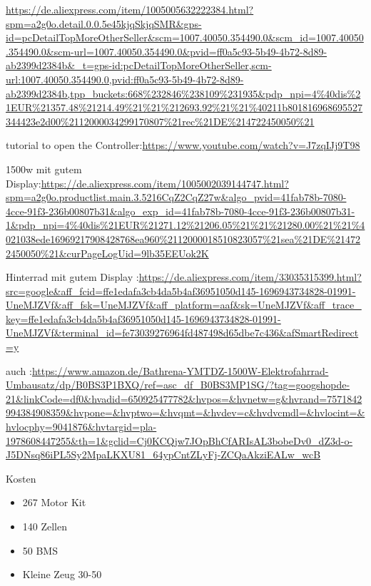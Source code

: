 

\url{https://de.aliexpress.com/item/1005005632222384.html?spm=a2g0o.detail.0.0.5e45kjqSkjqSMR&gps-id=pcDetailTopMoreOtherSeller&scm=1007.40050.354490.0&scm_id=1007.40050.354490.0&scm-url=1007.40050.354490.0&pvid=ff0a5c93-5b49-4b72-8d89-ab2399d2384b&_t=gps-id:pcDetailTopMoreOtherSeller,scm-url:1007.40050.354490.0,pvid:ff0a5c93-5b49-4b72-8d89-ab2399d2384b,tpp_buckets:668%232846%238109%231935&pdp_npi=4%40dis%21EUR%21357.48%21214.49%21%21%212693.92%21%21%40211b801816968695527344423e2d00%2112000034299170807%21rec%21DE%214722450050%21}


tutorial to open the Controller:\url{https://www.youtube.com/watch?v=J7zqIJj9T98}

1500w mit gutem Display:\url{https://de.aliexpress.com/item/1005002039144747.html?spm=a2g0o.productlist.main.3.5216CqZ2CqZ27w&algo_pvid=41fab78b-7080-4cce-91f3-236b00807b31&algo_exp_id=41fab78b-7080-4cce-91f3-236b00807b31-1&pdp_npi=4%40dis%21EUR%21271.12%21206.05%21%21%21280.00%21%21%4021038ede16969217908428768ea960%2112000018510823057%21sea%21DE%214722450050%21&curPageLogUid=9lb35EEUok2K}

Hinterrad mit gutem Display :\url{https://de.aliexpress.com/item/33035315399.html?src=google&aff_fcid=ffe1edafa3cb4da5b4af36951050d145-1696943734828-01991-UneMJZVf&aff_fsk=UneMJZVf&aff_platform=aaf&sk=UneMJZVf&aff_trace_key=ffe1edafa3cb4da5b4af36951050d145-1696943734828-01991-UneMJZVf&terminal_id=fe73039276964fd487498d65dbe7c436&afSmartRedirect=y}

auch :\url{https://www.amazon.de/Bathrena-YMTDZ-1500W-Elektrofahrrad-Umbausatz/dp/B0BS3P1BXQ/ref=asc_df_B0BS3MP1SG/?tag=googshopde-21&linkCode=df0&hvadid=650925477782&hvpos=&hvnetw=g&hvrand=7571842994384908359&hvpone=&hvptwo=&hvqmt=&hvdev=c&hvdvcmdl=&hvlocint=&hvlocphy=9041876&hvtargid=pla-1978608447255&th=1&gclid=Cj0KCQjw7JOpBhCfARIsAL3bobeDv0_dZ3d-o-J5DNsq86iPL5Sy2MpaLKXU81_64ypCntZLyFj-ZCQaAkziEALw_wcB}


Kosten

\begin{itemize}
    \item 267 Motor Kit 
    \item 140 Zellen
    \item 50 BMS
    \item Kleine Zeug 30-50
\end{itemize}